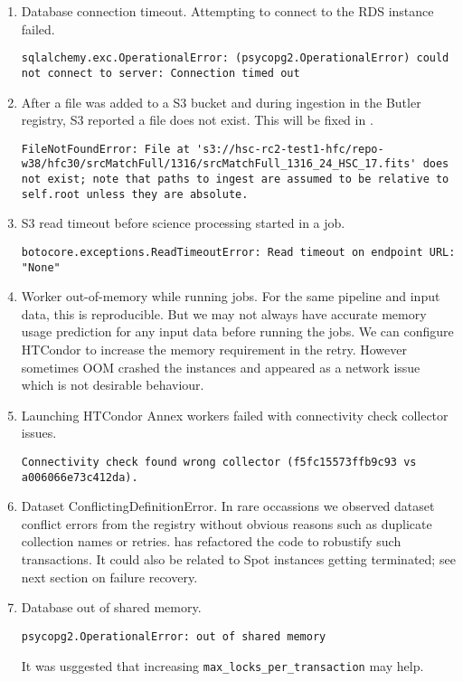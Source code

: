 \begin{enumerate}
\item Database connection timeout. Attempting to connect to the RDS instance failed.
\begin{lstlisting}[style=basherror]
sqlalchemy.exc.OperationalError: (psycopg2.OperationalError) could not connect to server: Connection timed out
\end{lstlisting}
\item
After a file was added to a S3 bucket and during ingestion in the Butler registry, S3 reported a file does not exist.
This will be fixed in .
\begin{lstlisting}[style=basherror]
FileNotFoundError: File at 's3://hsc-rc2-test1-hfc/repo-w38/hfc30/srcMatchFull/1316/srcMatchFull_1316_24_HSC_17.fits' does not exist; note that paths to ingest are assumed to be relative to self.root unless they are absolute.
\end{lstlisting}
\item S3 read timeout before science processing started in a job.
\begin{lstlisting}[style=basherror]
botocore.exceptions.ReadTimeoutError: Read timeout on endpoint URL: "None"
\end{lstlisting}
\item Worker out-of-memory while running jobs.
For the same pipeline and input data, this is reproducible.
But we may not always have accurate memory usage prediction for any input data before running the jobs.
We can configure HTCondor to increase the memory requirement in the retry.
However sometimes OOM crashed the instances and appeared as a network issue which is not  desirable behaviour.
\item Launching HTCondor Annex workers failed with connectivity check collector issues.
\begin{lstlisting}[style=basherror]
Connectivity check found wrong collector (f5fc15573ffb9c93 vs a006066e73c412da).
\end{lstlisting}
\item Dataset ConflictingDefinitionError.
In rare occassions we observed dataset conflict errors from the registry without obvious reasons such as duplicate collection names or retries.
 has refactored the code to robustify such transactions.
It could also be related to Spot instances getting terminated;
see next section on failure recovery.
\item Database out of shared memory.
\begin{lstlisting}[style=basherror]
psycopg2.OperationalError: out of shared memory
\end{lstlisting}
It was usggested that increasing \texttt{max\_locks\_per\_transaction} may help.
\end{enumerate}


